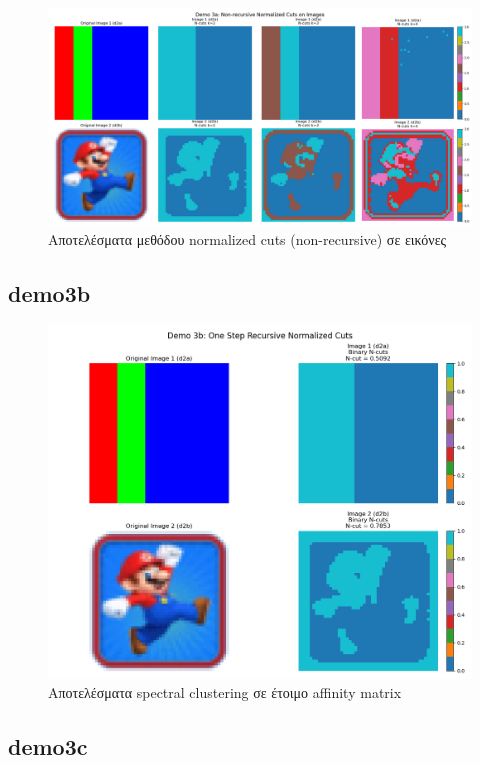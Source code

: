 \documentclass{article}
\begin{document}
\begin{figure}
    \centering
    \includegraphics[width=\linewidth]{Figure_3.png}
    \caption{Αποτελέσματα μεθόδου normalized cuts (non-recursive) σε εικόνες}\label{figure3}
\end{figure}
\subsection{demo3b}


\begin{figure}
    \centering
    \includegraphics[width=\linewidth]{Figure_4.png}
    \caption{Αποτελέσματα spectral clustering σε έτοιμο affinity matrix}\label{figure4}
\end{figure}
\subsection{demo3c}
\end{document}
